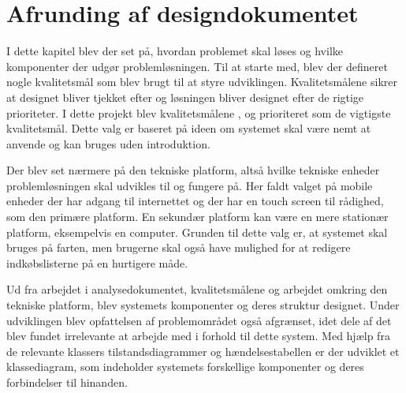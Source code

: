 \section{Afrunding af designdokumentet}
I dette kapitel blev der set på, hvordan problemet skal løses og hvilke komponenter der udgør problemløsningen. Til at starte med, blev der defineret nogle kvalitetsmål som blev brugt til at styre udviklingen. Kvalitetsmålene sikrer at designet bliver tjekket efter og løsningen bliver designet efter de rigtige prioriteter. I dette projekt blev kvalitetsmålene ,  og  prioriteret som de vigtigste kvalitetsmål. Dette valg er baseret på ideen om systemet skal være nemt at anvende og kan bruges uden introduktion.

Der blev set nærmere på den tekniske platform, altså hvilke tekniske enheder problemløsningen skal udvikles til og fungere på. Her faldt valget på mobile enheder der har adgang til internettet og der har en touch screen til rådighed, som den primære platform. En sekundær platform kan være en mere stationær platform, eksempelvis en computer.
Grunden til dette valg er, at systemet skal bruges på farten, men brugerne skal også have mulighed for at redigere indkøbslisterne på en hurtigere måde.

Ud fra arbejdet i analysedokumentet, kvalitetsmålene og arbejdet omkring den tekniske platform, blev systemets komponenter og deres struktur designet. Under udviklingen blev opfattelsen af problemområdet også afgrænset, idet dele af det blev fundet irrelevante at arbejde med i forhold til dette system.
Med hjælp fra de relevante klassers tilstandsdiagrammer og hændelsestabellen er der udviklet et klassediagram, som indeholder systemets forskellige komponenter og deres forbindelser til hinanden.